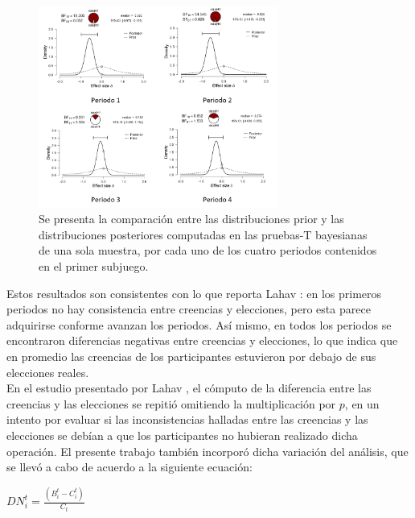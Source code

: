 \begin{figure}[th]
\centering
\includegraphics[width=0.70\textwidth]{Figures/Fig_1} 
\caption[Distribuciones prior y posterior de las Diferencias Normalizadas en el primer Subjuego, (prueba T bayesiana de una muestra)]{Se presenta la comparación entre las distribuciones prior y las distribuciones posteriores computadas en las pruebas-T bayesianas de una sola muestra, por cada uno de los cuatro periodos contenidos en el primer subjuego.}
\label{fig:DiferenciasNormalizadas_Subjuego1}
\end{figure}

Estos resultados son consistentes con lo que reporta Lahav \parencite*{Lahav2015}: en los primeros periodos no hay consistencia entre creencias y elecciones, pero esta parece adquirirse conforme avanzan los periodos. Así mismo, en todos los periodos se encontraron diferencias negativas entre creencias y elecciones, lo que indica que en promedio las creencias de los participantes estuvieron por debajo de sus elecciones reales.\\

En el estudio presentado por Lahav \parencite*{Lahav2015}, el cómputo de la diferencia entre las creencias y las elecciones se repitió omitiendo la multiplicación por $p$, en un intento por evaluar si las inconsistencias halladas entre las creencias y las elecciones se debían a que los participantes no hubieran realizado dicha operación. El presente trabajo también incorporó dicha variación del análisis, que se llevó a cabo de acuerdo a la siguiente ecuación:\\

\begin{center}
$DN_i^t = \frac{(B_i^t - C_i^t)}{C_t}$\\
\end{center}

